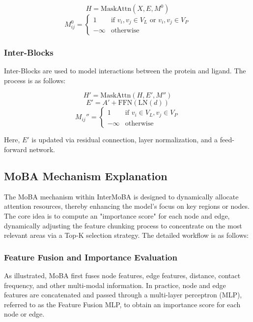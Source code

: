 \documentclass[lettersize,journal]{IEEEtran}
\begin{document}
\begin{equation}
H = \text{MaskAttn}\left( X,E,M^{0} \right)
\end{equation}
\begin{equation}
M_{ij}^{0} = 
\begin{cases} 
1 & \text{if } v_{i},v_{j} \in V_{L} \text{ or } v_{i},v_{j} \in V_{P} \\
-\infty & \text{otherwise}
\end{cases}
\end{equation}

\subsubsection{Inter-Blocks}
Inter-Blocks are used to model interactions between the protein and
ligand. The process is as follows:

\begin{equation}
H' = \text{MaskAttn}\left( H,E',M'' \right)
\end{equation}
\begin{equation}
E' = A' + \text{FFN}\left( \text{LN}(d) \right)
\end{equation}
\begin{equation}
M_{ij}'' = 
\begin{cases} 
1 & \text{if } v_{i} \in V_{L}, v_{j} \in V_{P} \\
-\infty & \text{otherwise}
\end{cases}
\end{equation}

Here, $E'$ is updated via residual connection, layer normalization, and
a feed-forward network.

\subsection{MoBA Mechanism Explanation}
The MoBA mechanism within InterMoBA is designed to dynamically allocate
attention resources, thereby enhancing the model's focus on key regions
or nodes. The core idea is to compute an "importance score" for each
node and edge, dynamically adjusting the feature chunking process to
concentrate on the most relevant areas via a Top-K selection strategy.
The detailed workflow is as follows:
\subsubsection{Feature Fusion and Importance Evaluation}
As illustrated, MoBA first fuses node features, edge features, distance,
contact frequency, and other multi-modal information. In practice, node
and edge features are concatenated and passed through a multi-layer
perceptron (MLP), referred to as the Feature Fusion MLP, to obtain an
importance score for each node or edge.
\end{document}
